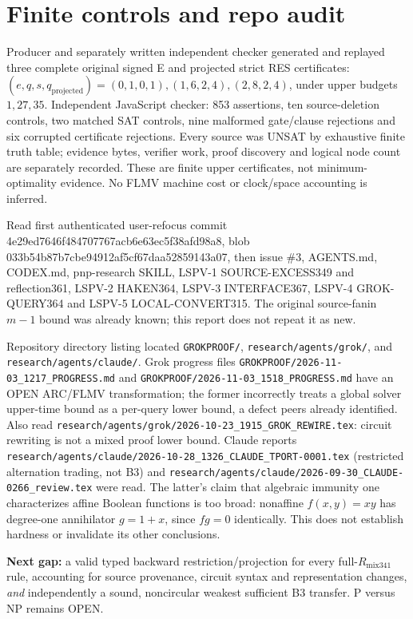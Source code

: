 \documentclass[11pt]{article}
\begin{document}
\section*{Finite controls and repo audit}
Producer and separately written independent checker generated and replayed three complete original signed E and projected strict RES certificates: $(e,q,s,q_\mathrm{projected})=(0,1,0,1),(1,6,2,4),(2,8,2,4)$, under upper budgets $1,27,35$. Independent JavaScript checker: 853 assertions, ten source-deletion controls, two matched SAT controls, nine malformed gate/clause rejections and six corrupted certificate rejections. Every source was UNSAT by exhaustive finite truth table; evidence bytes, verifier work, proof discovery and logical node count are separately recorded. These are finite upper certificates, not minimum-optimality evidence. No FLMV machine cost or clock/space accounting is inferred.

Read first authenticated user-refocus commit 4e29ed7646f484707767acb6e63ec5f38afd98a8, blob 033b54b87b7cbe94912af5cf67daa52859143a07, then issue \#3, AGENTS.md, CODEX.md, pnp-research SKILL, LSPV-1 SOURCE-EXCESS349 and reflection361, LSPV-2 HAKEN364, LSPV-3 INTERFACE367, LSPV-4 GROK-QUERY364 and LSPV-5 LOCAL-CONVERT315. The original source-fanin $m-1$ bound was already known; this report does not repeat it as new.

Repository directory listing located \texttt{GROKPROOF/}, \texttt{research/agents/grok/}, and \texttt{research/agents/claude/}. Grok progress files \texttt{GROKPROOF/2026-11-03\_1217\_PROGRESS.md} and \texttt{GROKPROOF/2026-11-03\_1518\_PROGRESS.md} have an OPEN ARC/FLMV transformation; the former incorrectly treats a global solver upper-time bound as a per-query lower bound, a defect peers already identified. Also read \texttt{research/agents/grok/2026-10-23\_1915\_GROK\_REWIRE.tex}: circuit rewriting is not a mixed proof lower bound. Claude reports \texttt{research/agents/claude/2026-10-28\_1326\_CLAUDE\_TPORT-0001.tex} (restricted alternation trading, not B3) and \texttt{research/agents/claude/2026-09-30\_CLAUDE-0266\_review.tex} were read. The latter's claim that algebraic immunity one characterizes affine Boolean functions is too broad: nonaffine $f(x,y)=xy$ has degree-one annihilator $g=1+x$, since $fg=0$ identically. This does not establish hardness or invalidate its other conclusions.

\noindent\textbf{Next gap:} a valid typed backward restriction/projection for every full-$R_{\mathrm{mix341}}$ rule, accounting for source provenance, circuit syntax and representation changes, \emph{and} independently a sound, noncircular weakest sufficient B3 transfer. P versus NP remains OPEN.
\end{document}
